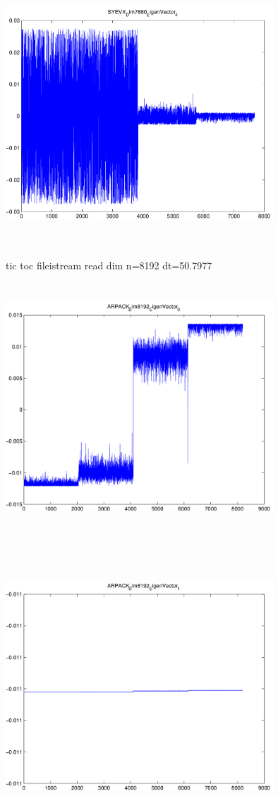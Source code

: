 \documentclass[9pt]{article}
\theoremstyle{plain}
\theoremstyle{definition}
\theoremstyle{remark}
\numberwithin{equation}{section}
\begin{document}
\includegraphics[width=10.0cm,height=10.0cm]{SYEVX_Dim7680_EigenVector_4.pdf}

tic toc fileistream read dim n=8192 dt=50.7977
\includegraphics[width=10.0cm,height=10.0cm]{ARPACK_Dim8192_EigenVector_0.pdf}

\includegraphics[width=10.0cm,height=10.0cm]{ARPACK_Dim8192_EigenVector_1.pdf}
\end{document}
